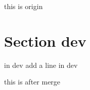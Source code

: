 \documentclass{article}
\begin{document}
    this is origin

    \section{Section dev}
    in dev
    add a line in dev

    this is after merge
\end{document}
